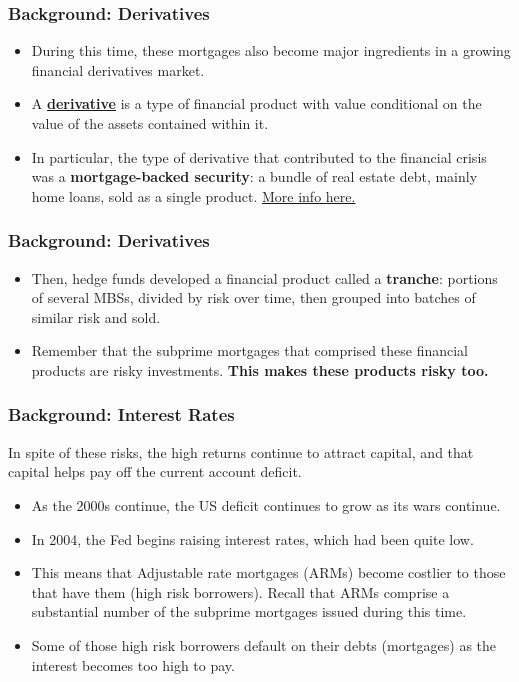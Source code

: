 \documentclass[handout]{beamer}
\begin{document}
\begin{frame} 
	\frametitle{\LARGE{Background: Derivatives}}
	\begin{itemize}
		\item During this time, these mortgages also become major ingredients in a growing financial derivatives market. \pause
		\item A \textbf{\href{https://www.thebalancemoney.com/role-of-derivatives-in-creating-mortgage-crisis-3970477}{derivative}} is a type of financial product with value conditional on the value of the assets contained within it. \pause
		\item In particular, the type of derivative that contributed to the financial crisis was a \textbf{mortgage-backed security}: a bundle of real estate debt, mainly home loans, sold as a single product. \href{https://www.investopedia.com/terms/m/mbs.asp}{More info here.}
	\end{itemize}
\end{frame}

\begin{frame} 
	\frametitle{\LARGE{Background: Derivatives}}
	\begin{itemize}
		\item Then, hedge funds developed a financial product called a \textbf{tranche}: portions of several MBSs, divided by risk over time, then grouped into batches of similar risk and sold. \pause
		\item Remember that the subprime mortgages that comprised these financial products are risky investments. \textbf{This makes these products risky too.}
	\end{itemize}
\end{frame}

\begin{frame} 
	\frametitle{\LARGE{Background: Interest Rates}}
	In spite of these risks, the high returns continue to attract capital, and that capital helps pay off the current account deficit.
	\begin{itemize}
		\item As the 2000s continue, the US deficit continues to grow as its wars continue. \pause
		\item In 2004, the Fed begins raising interest rates, which had been quite low. \pause
		\item This means that Adjustable rate mortgages (ARMs) become costlier to those that have them (high risk borrowers). Recall that ARMs comprise a substantial number of the subprime mortgages issued during this time. \pause
		\item Some of those high risk borrowers default on their debts (mortgages) as the interest becomes too high to pay. 
	\end{itemize}
\end{frame}
\end{document}

